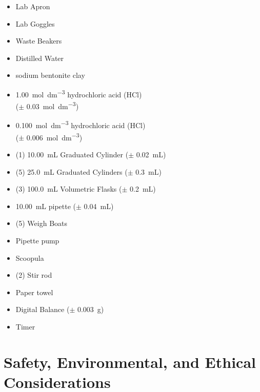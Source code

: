 \documentclass[11pt, letterpaper]{article}
\begin{document}
\begin{multicols}{2}
    \begin{itemize}
        \item Lab Apron
        \item Lab Goggles
        \item Waste Beakers
        \item Distilled Water
        \item sodium bentonite clay
        \item \SI{1.00}{mol.dm^{-3}} hydrochloric acid (HCl) \\ (\(\pm\) \SI{0.03}{mol.dm^{-3}})
        \item \SI{0.100}{mol.dm^{-3}} hydrochloric acid (HCl) \\ (\(\pm\) \SI{0.006}{mol.dm^{-3}})
        \item (1) \SI{10.00}{mL} Graduated Cylinder (\(\pm\) \SI{0.02}{mL})
        \item (5) \SI{25.0}{mL} Graduated Cylinders (\(\pm\) \SI{0.3}{mL})
        \item (3) \SI{100.0}{mL} Volumetric Flasks (\(\pm\) \SI{0.2}{mL})
        \item \SI{10.00}{mL} pipette (\(\pm\) \SI{0.04}{mL})
        \item (5) Weigh Boats
        \item Pipette pump
        \item Scoopula
        \item (2) Stir rod
        \item Paper towel
        \item Digital Balance (\(\pm\) \SI{0.003}{g})
        \item Timer
    \end{itemize}

\end{multicols}

\section{Safety, Environmental, and Ethical Considerations}
\end{document}
